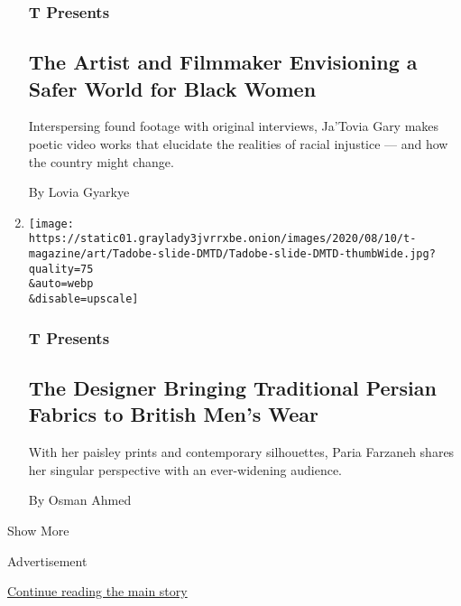 \begin{enumerate}
  \hypertarget{t-presents-7}{%
  \subsubsection{T Presents}\label{t-presents-7}}

  \hypertarget{the-artist-and-filmmaker-envisioning-a-safer-world-for-black-women}{%
  \subsection{The Artist and Filmmaker Envisioning a Safer World for
  Black
  Women}\label{the-artist-and-filmmaker-envisioning-a-safer-world-for-black-women}}

  Interspersing found footage with original interviews, Ja'Tovia Gary
  makes poetic video works that elucidate the realities of racial
  injustice --- and how the country might change.

  By Lovia Gyarkye
\item
  \href{/2020/08/10/t-magazine/paria-farzaneh-fashion-menswear.html}{}

  \texttt{[image: https://static01.graylady3jvrrxbe.onion/images/2020/08/10/t-magazine/art/Tadobe-slide-DMTD/Tadobe-slide-DMTD-thumbWide.jpg?quality=75\\\&auto=webp\\\&disable=upscale]}

  \hypertarget{t-presents-8}{%
  \subsubsection{T Presents}\label{t-presents-8}}

  \hypertarget{the-designer-bringing-traditional-persian-fabrics-to-british-mens-wear}{%
  \subsection{The Designer Bringing Traditional Persian Fabrics to
  British Men's
  Wear}\label{the-designer-bringing-traditional-persian-fabrics-to-british-mens-wear}}

  With her paisley prints and contemporary silhouettes, Paria Farzaneh
  shares her singular perspective with an ever-widening audience.

  By Osman Ahmed
\end{enumerate}

Show More

Advertisement

\protect\hyperlink{after-mid2}{Continue reading the main story}

